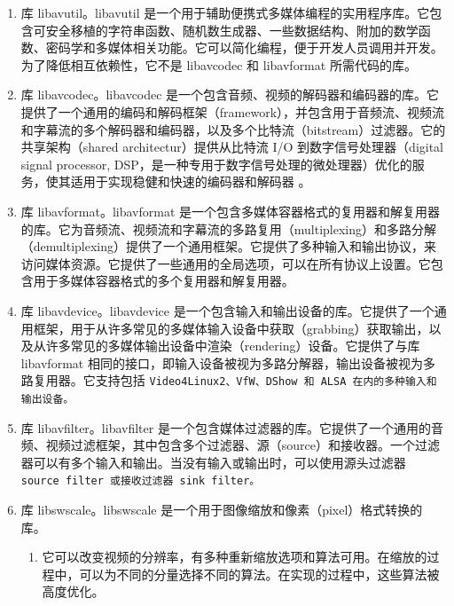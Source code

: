 \begin{enumerate}
    \item 库 libavutil。libavutil 是一个用于辅助便携式多媒体编程的实用程序库。它包含可安全移植的字符串函数、随机数生成器、一些数据结构、附加的数学函数、密码学和多媒体相关功能。它可以简化编程，便于开发人员调用并开发。为了降低相互依赖性，它不是 libavcodec 和 libavformat 所需代码的库。
    \item 库 libavcodec。libavcodec 是一个包含音频、视频的解码器和编码器的库。它提供了一个通用的编码和解码框架（framework），并包含用于音频流、视频流和字幕流的多个解码器和编码器，以及多个比特流（bitstream）过滤器。它的共享架构（shared architectur）提供从比特流 I/O 到数字信号处理器（digital signal processor, DSP，是一种专用于数字信号处理的微处理器）优化的服务，使其适用于实现稳健和快速的编码器和解码器 \cite{libavcodec}。
    \item 库 libavformat。libavformat 是一个包含多媒体容器格式的复用器和解复用器的库。它为音频流、视频流和字幕流的多路复用（multiplexing）和多路分解（demultiplexing）提供了一个通用框架。它提供了多种输入和输出协议，来访问媒体资源。它提供了一些通用的全局选项，可以在所有协议上设置。它包含用于多媒体容器格式的多个复用器和解复用器。
    \item 库 libavdevice。libavdevice 是一个包含输入和输出设备的库。它提供了一个通用框架，用于从许多常见的多媒体输入设备中获取（grabbing）获取输出，以及从许多常见的多媒体输出设备中渲染（rendering）设备。它提供了与库 libavformat 相同的接口，即输入设备被视为多路分解器，输出设备被视为多路复用器。它支持包括 \tt{Video4Linux2}、\tt{VfW}、\tt{DShow} 和 \tt{ALSA} 在内的多种输入和输出设备。
    \item 库 libavfilter。libavfilter 是一个包含媒体过滤器的库。它提供了一个通用的音频、视频过滤框架，其中包含多个过滤器、源（source）和接收器。一个过滤器可以有多个输入和输出。当没有输入或输出时，可以使用源头过滤器 \tt{source filter} 或接收过滤器 \tt{sink filter}。
    \item 库 libswscale。libswscale 是一个用于图像缩放和像素（pixel）格式转换的库。
    \begin{enumerate}
        \item 它可以改变视频的分辨率，有多种重新缩放选项和算法可用。在缩放的过程中，可以为不同的分量选择不同的算法。在实现的过程中，这些算法被高度优化。%

\end{enumerate}
\end{enumerate}
